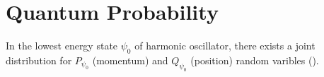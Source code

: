 \documentclass[main.tex]{subfiles}
\begin{document}
\section{Quantum Probability}
\begin{example}
In the lowest energy state $\psi_0$ of harmonic oscillator, there exists a joint distribution for $P_{\psi_0}$ (momentum) and $Q_{\psi_0}$ (position) random varibles (\cite{suppes1961}).
\end{example}
\end{document}
